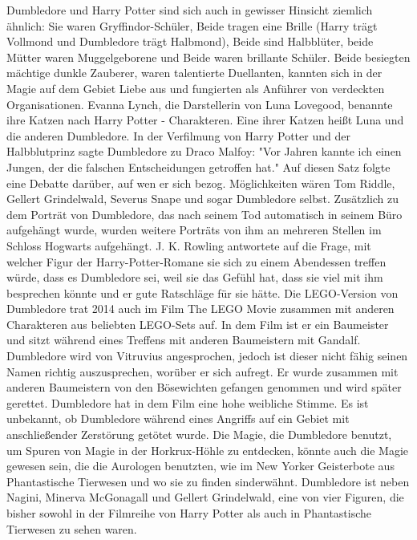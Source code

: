 \documentclass[a4paper, 10pt]{article}
\begin{document}
\vspace{10pt}
\newline
{}  
Dumbledore und Harry Potter sind sich auch in gewisser Hinsicht ziemlich ähnlich: Sie waren Gryffindor-Schüler, Beide tragen eine Brille (Harry trägt Vollmond und Dumbledore trägt Halbmond), Beide sind Halbblüter, beide Mütter waren Muggelgeborene und Beide waren brillante Schüler. Beide besiegten mächtige dunkle Zauberer, waren talentierte Duellanten, kannten sich in der Magie auf dem Gebiet Liebe aus und fungierten als Anführer von verdeckten Organisationen.
\vspace{10pt}
\newline
{}  
Evanna Lynch, die Darstellerin von Luna Lovegood, benannte ihre Katzen nach Harry Potter - Charakteren. Eine ihrer Katzen heißt Luna und die anderen Dumbledore.
In der Verfilmung von Harry Potter und der Halbblutprinz sagte Dumbledore zu Draco Malfoy: "Vor Jahren kannte ich einen Jungen, der die falschen Entscheidungen getroffen hat." Auf diesen Satz folgte eine Debatte darüber, auf wen er sich bezog. Möglichkeiten wären Tom Riddle, Gellert Grindelwald, Severus Snape und sogar Dumbledore selbst.
\vspace{10pt}
\newline
{}  
Zusätzlich zu dem Porträt von Dumbledore, das nach seinem Tod automatisch in seinem Büro aufgehängt wurde, wurden weitere Porträts von ihm an mehreren Stellen im Schloss Hogwarts aufgehängt.
J. K. Rowling antwortete auf die Frage, mit welcher Figur der Harry-Potter-Romane sie sich zu einem Abendessen treffen würde, dass es Dumbledore sei, weil sie das Gefühl hat, dass sie viel mit ihm besprechen könnte und er gute Ratschläge für sie hätte.
\vspace{10pt}
\newline
{}  
Die LEGO-Version von Dumbledore trat 2014 auch im Film The LEGO Movie zusammen mit anderen Charakteren aus beliebten LEGO-Sets auf. In dem Film ist er ein Baumeister und sitzt während eines Treffens mit anderen Baumeistern mit Gandalf. Dumbledore wird von Vitruvius angesprochen, jedoch ist dieser nicht fähig seinen Namen richtig auszusprechen, worüber er sich aufregt. Er wurde zusammen mit anderen Baumeistern von den Bösewichten gefangen genommen und wird später gerettet. Dumbledore hat in dem Film eine hohe weibliche Stimme. Es ist unbekannt, ob Dumbledore während eines Angriffs auf ein Gebiet mit anschließender Zerstörung getötet wurde.
\vspace{10pt}
\newline
{}  
Die Magie, die Dumbledore benutzt, um Spuren von Magie in der Horkrux-Höhle zu entdecken, könnte auch die Magie gewesen sein, die die Aurologen benutzten, wie im New Yorker Geisterbote aus Phantastische Tierwesen und wo sie zu finden sinderwähnt.
Dumbledore ist neben Nagini, Minerva McGonagall und Gellert Grindelwald, eine von vier Figuren, die bisher sowohl in der Filmreihe von Harry Potter als auch in Phantastische Tierwesen zu sehen waren.
\end{document}
